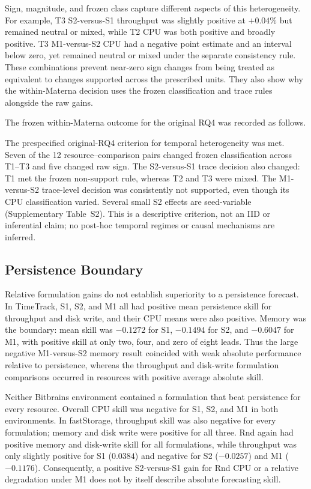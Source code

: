 \documentclass[5p,twocolumn]{elsarticle}
\begin{document}
Sign, magnitude, and frozen class capture different aspects of this
heterogeneity. For example, T3 S2-versus-S1 throughput was slightly positive at
$+0.04\%$ but remained neutral or mixed, while T2 CPU was both positive and
broadly positive. T3 M1-versus-S2 CPU had a negative point estimate and an
interval below zero, yet remained neutral or mixed under the separate
consistency rule. These combinations prevent near-zero sign changes from being
treated as equivalent to changes supported across the prescribed units. They
also show why the within-Materna decision uses the frozen classification and
trace rules alongside the raw gains.

The frozen within-Materna outcome for the original RQ4 was recorded as
follows.

\noindent The prespecified original-RQ4 criterion for temporal heterogeneity was met.
Seven of the 12
resource--comparison pairs changed frozen classification across T1--T3 and
five changed raw sign. The S2-versus-S1 trace decision also changed: T1 met the
frozen non-support rule, whereas T2 and T3 were mixed. The M1-versus-S2
trace-level decision was consistently not supported, even though its CPU
classification varied. Several small S2 effects are seed-variable
(Supplementary Table~S2). This is a descriptive criterion, not an IID or
inferential claim; no post-hoc temporal regimes or causal mechanisms are
inferred.

\subsection{Persistence Boundary}
\label{sec:results-persistence}

Relative formulation gains do not establish superiority to a persistence
forecast. In TimeTrack, S1, S2, and M1 all had positive mean persistence skill
for throughput and disk write, and their CPU means were also positive. Memory
was the boundary: mean skill was $-0.1272$ for S1, $-0.1494$ for S2, and
$-0.6047$ for M1, with positive skill at only two, four, and zero of eight
leads. Thus the large negative M1-versus-S2 memory result coincided with weak
absolute performance relative to persistence, whereas the throughput and
disk-write formulation comparisons occurred in resources with positive
average absolute skill.

Neither Bitbrains environment contained a formulation that beat persistence
for every resource. Overall CPU skill was negative for S1, S2, and M1 in both
environments. In fastStorage, throughput skill was also negative for every
formulation; memory and disk write were positive for all three. Rnd again had
positive memory and disk-write skill for all formulations, while throughput
was only slightly positive for S1 ($0.0384$) and negative for S2 ($-0.0257$)
and M1 ($-0.1176$). Consequently, a positive S2-versus-S1 gain for Rnd CPU or a
relative degradation under M1 does not by itself describe absolute forecasting
skill.
\end{document}
